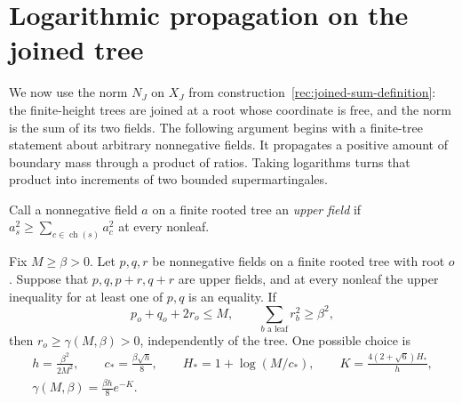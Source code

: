 \section{Logarithmic propagation on the joined tree}\label{log:section}

We now use the norm $N_J$ on $X_J$ from
construction~\ref{rec:joined-sum-definition}: the finite-height trees are joined
at a root whose coordinate is free, and the norm is the sum of its two
fields.  The following argument begins with a finite-tree statement
about arbitrary nonnegative fields.  It propagates a positive amount
of boundary mass through a product of ratios.  Taking logarithms
turns that product into increments of two bounded supermartingales.

Call a nonnegative field $a$ on a finite rooted tree an \emph{upper
field} if $a_s^2\ge\sum_{c\in\operatorname{ch}(s)}a_c^2$ at every
nonleaf.

\begin{lemma}\label{log:finite-tree}
Fix $M\ge\beta>0$.  Let $p,q,r$ be nonnegative fields on a finite
rooted tree with root $o$.  Suppose that $p,q,p+r,q+r$ are upper
fields, and at every nonleaf the upper inequality for at least one of
$p,q$ is an equality.  If
\[
 p_o+q_o+2r_o\le M,\qquad \sum_{b\text{ a leaf}}r_b^2\ge\beta^2,
\]
then $r_o\ge\gamma(M,\beta)>0$, independently of the tree.
One possible choice is
\begin{equation}\label{log:gamma}
 \begin{gathered}
 h=\frac{\beta^2}{2M^2},\qquad c_* =\frac{\beta\sqrt h}{8},\qquad
 H_*=1+\log(M/c_*),\qquad
 K=\frac{4(2+\sqrt6)H_*}{h},\\
 \gamma(M,\beta)=\frac{\beta h}{8}e^{-K}.
 \end{gathered}
\end{equation}
\end{lemma}

